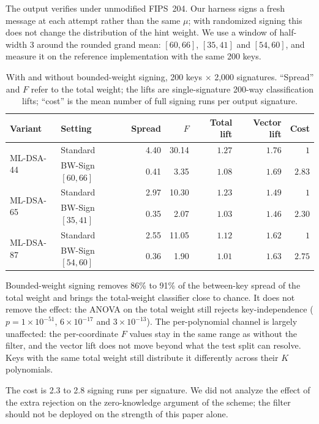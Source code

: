 \documentclass{article}
\begin{document}
The output verifies under unmodified FIPS~204.  Our harness signs a fresh
message at each attempt rather than the same $\mu$; with randomized signing this
does not change the distribution of the hint weight.  We use a window of half-width
3 around the rounded grand mean: $[60, 66]$, $[35, 41]$ and $[54, 60]$, and
measure it on the reference implementation with the same 200 keys.

\begin{table}[h!]
\centering
\caption{With and without bounded-weight signing, 200 keys $\times$ 2,000
signatures.  ``Spread'' and $F$ refer to the total weight; the lifts are
single-signature 200-way classification lifts; ``cost'' is the mean number of
full signing runs per output signature.}
\label{tab:bwresults}
\begin{tabular}{llrrrrr}
\toprule
\textbf{Variant} & \textbf{Setting} & \textbf{Spread} & $F$ &
\textbf{Total lift} & \textbf{Vector lift} & \textbf{Cost} \\
\midrule
\multirow{2}{*}{ML-DSA-44}
  & Standard          & 4.40 & 30.14 & $1.27$ & $1.76$ & $1$ \\
  & BW-Sign $[60,66]$ & 0.41 &  3.35 & $1.08$ & $1.69$ & $2.83$ \\
\midrule
\multirow{2}{*}{ML-DSA-65}
  & Standard          & 2.97 & 10.30 & $1.23$ & $1.49$ & $1$ \\
  & BW-Sign $[35,41]$ & 0.35 &  2.07 & $1.03$ & $1.46$ & $2.30$ \\
\midrule
\multirow{2}{*}{ML-DSA-87}
  & Standard          & 2.55 & 11.05 & $1.12$ & $1.62$ & $1$ \\
  & BW-Sign $[54,60]$ & 0.36 &  1.90 & $1.01$ & $1.63$ & $2.75$ \\
\bottomrule
\end{tabular}
\end{table}

Bounded-weight signing removes 86\% to 91\% of the between-key spread of the
total weight and brings the total-weight classifier close to chance.  It does
not remove the effect: the ANOVA on the total weight still rejects
key-independence ($p = 1\times10^{-51}$, $6\times10^{-17}$ and $3\times10^{-13}$).
The per-polynomial channel is largely unaffected: the per-coordinate $F$ values stay in
the same range as without the filter, and the vector lift does not move beyond
what the test split can resolve.  Keys with the same total weight still
distribute it differently across their $K$ polynomials.

The cost is 2.3 to 2.8 signing runs per signature.  We did not analyze the
effect of the extra rejection on the zero-knowledge argument of the scheme;
the filter should not be deployed on the strength of this paper alone.
\end{document}
